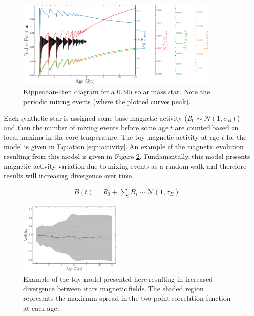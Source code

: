 \begin{figure}
  \centering
  \includegraphics[width=0.9\textwidth]{figures/Kippenhan_clamped.pdf}
  \caption{Kippenhan-Iben diagram for a 0.345 solar mass star. Note the
  periodic mixing events (where the plotted curves peak).}
  \label{fig:kippenhan}
\end{figure}

Each synthetic star is assigned some base magnetic activity ($B_{0} \sim
\mathcal{N}(1, \sigma_{B})$) and then the number of mixing events before some age $t$
are counted based on local maxima in the core temperature. The toy magnetic
activity at age $t$ for the model is given in Equation \ref{eqn:activity}. An
example of the magnetic evolution resulting from this model is given in Figure
\ref{fig:simpleB}. Fundamentally, this model presents magnetic
activity variation due to mixing events as a random walk and therefore results will
increasing divergence over time.

\begin{align}\label{eqn:activity}
  B(t) = B_{0} + \sum_{i}B_{i} \sim \mathcal{N}(1, \sigma_{B}) 
\end{align}

\begin{figure}
  \centering
  \includegraphics[width=0.45\textwidth]{figures/simpleBEvolution.pdf}
  \caption{Example of the toy model presented here resulting in increased
  divergence between stars magnetic fields. The shaded region represents the
  maximum spread in the two point correlation function at each age.}
  \label{fig:simpleB}
\end{figure}

